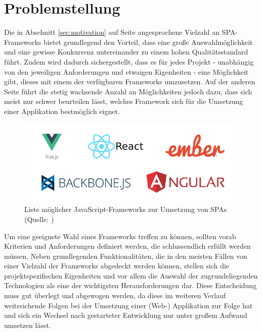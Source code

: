 \documentclass[a4paper,12pt,twoside]{scrreprt}
\begin{document}
\section{Problemstellung}
\label{sec:problemstellung}
Die in Abschnitt \ref{sec:motivation} auf Seite \pageref{sec:motivation} angesprochene Vielzahl an \acs{SPA}-Frameworks bietet grundlegend den Vorteil, dass eine große Auswahlmöglichkeit und eine gewisse Konkurrenz untereinander zu einem hohen Qualitätsstandard führt. Zudem wird dadurch sichergestellt, dass es für jedes Projekt - unabhängig von den jeweiligen Anforderungen und etwaigen Eigenheiten - eine Möglichkeit gibt, dieses mit einem der verfügbaren Frameworks umzusetzen. Auf der anderen Seite führt die stetig wachsende Anzahl an Möglichkeiten jedoch dazu, dass sich meist nur schwer beurteilen lässt, welches Framework sich für die Umsetzung einer Applikation bestmöglich eignet.

\begin{figure}[ht]
    \centering
    \includegraphics[scale=0.5]{images/js-frameworks.png}
    \caption[Liste möglicher JavaScript-Frameworks zur Umsetzung von \aclp{SPA}]{Liste möglicher JavaScript-Frameworks zur Umsetzung von \aclp{SPA} (Quelle: \cite{a_best_2020})}
    \label{fig:js-frameworks}
\end{figure}

Um eine geeignete Wahl eines Frameworks treffen zu können, sollten vorab Kriterien und Anforderungen definiert werden, die schlussendlich erfüllt werden müssen. Neben grundlegenden Funktionalitäten, die in den meisten Fällen von einer Vielzahl der Frameworks abgedeckt werden können, stellen sich die projektspezifischen Eigenheiten und vor allem die Auswahl der zugrundeliegenden Technologien als eine der wichtigsten Herausforderungen dar. Diese Entscheidung muss gut überlegt und abgewogen werden, da diese im weiteren Verlauf weitreichende Folgen bei der Umsetzung einer (Web-) Applikation zur Folge hat und sich ein Wechsel nach gestarteter Entwicklung nur unter großem Aufwand umsetzen lässt.
\end{document}
